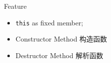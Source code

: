 
Feature
\begin{itemize}
	\item \verb`this` as fixed member;
	\item {Constructor Method} 构造函数
	\item Destructor Method 解析函数 %
\end{itemize}
